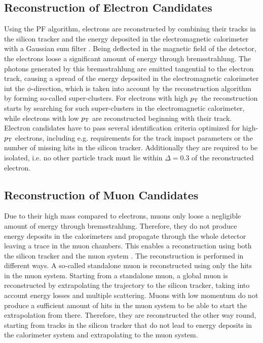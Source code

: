 \subsection{Reconstruction of Electron Candidates}
Using the PF algorithm, electrons are reconstructed by combining their tracks in the silicon tracker and the energy deposited in the electromagnetic calorimeter with a Gaussian sum filter \cite{elreco1}. Being deflected in the magnetic field of the detector, the electrons loose a significant amount of energy through bremsstrahlung. The photons generated by this bremsstrahlung are emitted tangential to the electron track, causing a spread of the energy deposited in the electromagnetic calorimeter int the $\phi$-direction, which is taken into account by the reconstruction algorithm by forming so-called super-clusters. For electrons with high $p_{\rm T}$ the reconstruction starts by searching for such super-clusters in the electromagnetic calorimeter, while electrons with low $p_{\rm T}$ are reconstructed beginning with their track.\\

\noindent Electron candidates have to pass several identification criteria optimized for high-$p_{\rm T}$ electrons, including e.g. requirements for the track impact parameters or the number of missing hits in the silicon tracker. Additionally they are required to be isolated, i.e. no other particle track must lie within $\Delta=0.3$ of the reconstructed electron.
\subsection{Reconstruction of Muon Candidates}
Due to their high mass compared to electrons, muons  only loose a negligible amount of energy through bremsstrahlung. Therefore, they do not produce energy deposits in the calorimeters and propagate through the whole detector leaving a trace in the muon chambers. This enables a reconstruction using both the silicon tracker and the muon system \cite{muonreco}. The reconstruction is performed in different ways. A so-called standalone muon is reconstructed using only the hits in the muon system. Starting from a standalone muon, a global muon is reconstructed by extrapolating the trajectory to the silicon tracker, taking into account energy losses and multiple scattering. Muons with low momentum do not produce a sufficient amount of hits in the muon system to be able to start the extrapolation from there. Therefore, they are reconstructed the other way round, starting from tracks in the silicon tracker that do not lead to energy deposits in the calorimeter system and extrapolating to the muon system.


